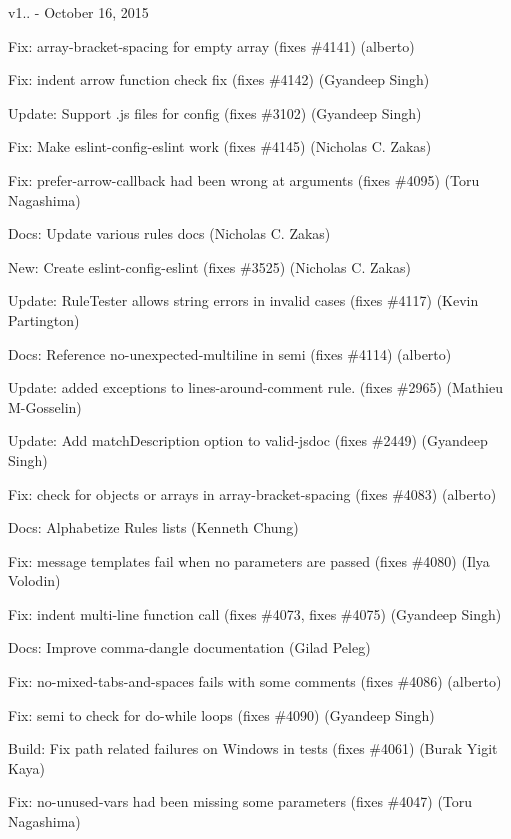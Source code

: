 v1.. -\/ October 16, 2015


\begin{DoxyItemize}
\item Fix\+: array-\/bracket-\/spacing for empty array (fixes \#4141) (alberto)
\item Fix\+: {\ttfamily indent} arrow function check fix (fixes \#4142) (Gyandeep Singh)
\item Update\+: Support .js files for config (fixes \#3102) (Gyandeep Singh)
\item Fix\+: Make eslint-\/config-\/eslint work (fixes \#4145) (Nicholas C. Zakas)
\item Fix\+: {\ttfamily prefer-\/arrow-\/callback} had been wrong at arguments (fixes \#4095) (Toru Nagashima)
\item Docs\+: Update various rules docs (Nicholas C. Zakas)
\item New\+: Create eslint-\/config-\/eslint (fixes \#3525) (Nicholas C. Zakas)
\item Update\+: Rule\+Tester allows string errors in invalid cases (fixes \#4117) (Kevin Partington)
\item Docs\+: Reference no-\/unexpected-\/multiline in semi (fixes \#4114) (alberto)
\item Update\+: added exceptions to {\ttfamily lines-\/around-\/comment} rule. (fixes \#2965) (Mathieu M-\/\+Gosselin)
\item Update\+: Add {\ttfamily match\+Description} option to {\ttfamily valid-\/jsdoc} (fixes \#2449) (Gyandeep Singh)
\item Fix\+: check for objects or arrays in array-\/bracket-\/spacing (fixes \#4083) (alberto)
\item Docs\+: Alphabetize Rules lists (Kenneth Chung)
\item Fix\+: message templates fail when no parameters are passed (fixes \#4080) (Ilya Volodin)
\item Fix\+: {\ttfamily indent} multi-\/line function call (fixes \#4073, fixes \#4075) (Gyandeep Singh)
\item Docs\+: Improve comma-\/dangle documentation (Gilad Peleg)
\item Fix\+: no-\/mixed-\/tabs-\/and-\/spaces fails with some comments (fixes \#4086) (alberto)
\item Fix\+: {\ttfamily semi} to check for do-\/while loops (fixes \#4090) (Gyandeep Singh)
\item Build\+: Fix path related failures on Windows in tests (fixes \#4061) (Burak Yigit Kaya)
\item Fix\+: {\ttfamily no-\/unused-\/vars} had been missing some parameters (fixes \#4047) (Toru Nagashima)

\end{DoxyItemize}
